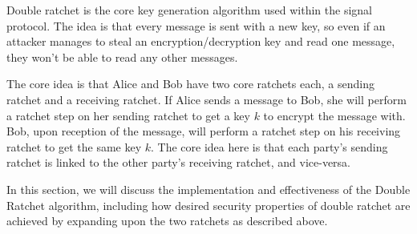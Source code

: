 Double ratchet is the core key generation algorithm used within the signal protocol.
The idea is that every message is sent with a new key, so even if an attacker manages 
to steal an encryption/decryption key and read one message, they won't be able to read 
any other messages. 

The core idea is that Alice and Bob have two core ratchets each, a sending ratchet and a 
receiving ratchet. If Alice sends a message to Bob, she will perform a ratchet step on her sending 
ratchet to get a key $k$ to encrypt the message with. Bob, upon reception of the message, will perform 
a ratchet step on his receiving ratchet to get the same key $k$. The core idea here is that each party's 
sending ratchet is linked to the other party's receiving ratchet, and vice-versa.

In this section, we will discuss the implementation and effectiveness of 
the Double Ratchet algorithm, including how desired security properties of double ratchet are 
achieved by expanding upon the two ratchets as described above.
